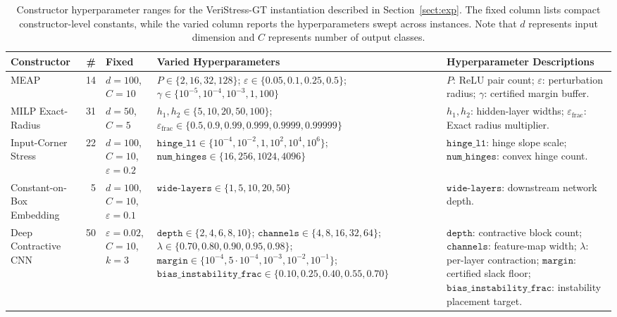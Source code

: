 \documentclass{article}
\theoremstyle{definition}
\begin{document}
\begin{table}[ht]
\caption{Constructor hyperparameter ranges for the VeriStress-GT instantiation described in Section~\ref{sect:exp}. The fixed column lists compact constructor-level constants, while the varied column reports the hyperparameters swept across instances. Note that $d$ represents input dimension and $C$ represents number of output classes.}
\centering
\scriptsize
\setlength{\tabcolsep}{3pt}
\renewcommand{\arraystretch}{1.18}
\begin{tabularx}{\textwidth}{
@{}
>{\raggedright\arraybackslash}p{}
r
>{\raggedright\arraybackslash}p{}
>{\raggedright\arraybackslash}p{}
>{\raggedright\arraybackslash}X
@{}}
\hline
Constructor & \# & Fixed & Varied Hyperparameters & Hyperparameter Descriptions \\
\hline

MEAP
& 14
& $d=100$, $C=10$
& $P\in\{2,16,32,128\}$; $\varepsilon\in\{0.05,0.1,0.25,0.5\}$; $\gamma\in\{10^{-5},10^{-4},10^{-3},1,100\}$
& $P$: ReLU pair count; $\varepsilon$: perturbation radius; $\gamma$: certified margin buffer. \\
\hline

MILP Exact-Radius
& 31
& $d=50$, $C=5$
& $h_1,h_2\in\{5,10,20,50,100\}$; $\varepsilon_{\mathrm{frac}}\in\{0.5,0.9,0.99,0.999,0.9999,0.99999\}$
& $h_1,h_2$: hidden-layer widths; $\varepsilon_{\mathrm{frac}}$: 
Exact radius multiplier. \\
\hline

Input-Corner Stress
& 22
& $d=100$, $C=10$, $\varepsilon=0.2$
& $\texttt{hinge\_l1}\in\{10^{-4},10^{-2},1,10^2,10^4,10^6\}$; $\texttt{num\_hinges}\in\{16,256,1024,4096\}$
& $\texttt{hinge\_l1}$: hinge slope scale; $\texttt{num\_hinges}$: convex hinge count. \\
\hline

Constant-on-Box Embedding
& 5
& $d=100$, $C=10$, $\varepsilon=0.1$
& $\texttt{wide-layers}\in\{1,5,10,20,50\}$
& $\texttt{wide-layers}$: downstream network depth. \\
\hline

Deep Contractive CNN
& 50
& $\varepsilon=0.02$, $C=10$, $k=3$
& $\texttt{depth}\in\{2,4,6,8,10\}$; $\texttt{channels}\in\{4,8,16,32,64\}$; $\lambda\in\{0.70,0.80,0.90,0.95,0.98\}$; $\texttt{margin}\in\{10^{-4},5\cdot10^{-4},10^{-3},10^{-2},10^{-1}\}$; $\texttt{bias\_instability\_frac}\in\{0.10,0.25,0.40,0.55,0.70\}$
& $\texttt{depth}$: contractive block count; $\texttt{channels}$: feature-map width; $\lambda$: per-layer contraction; $\texttt{margin}$: certified slack floor; $\texttt{bias\_instability\_frac}$: instability placement target. \\
\hline


\end{tabularx}
\end{table}
\end{document}
